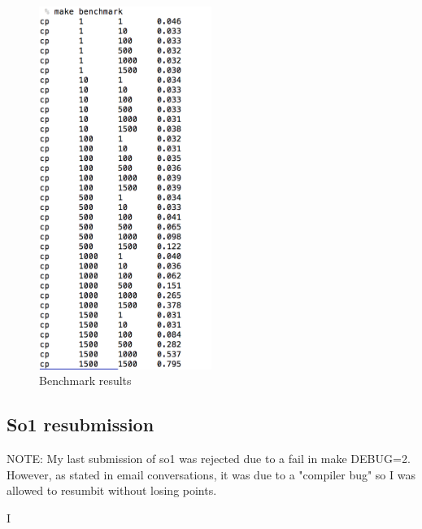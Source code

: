 \documentclass[a4paper,10pt]{article}
\begin{document}
\begin{figure}[H]
\centering
\includegraphics[width=0.5\textwidth]{figures/w4_benchmark}
\caption{Benchmark results}
\label{fig:pca_type}
\end{figure}




\subsection{So1 resubmission}
NOTE: My last submission of so1 was rejected due to a fail in make DEBUG=2. However, as stated in email conversations, it was due to a "compiler bug" so I was allowed to resumbit without losing points.  


I
\end{document}
